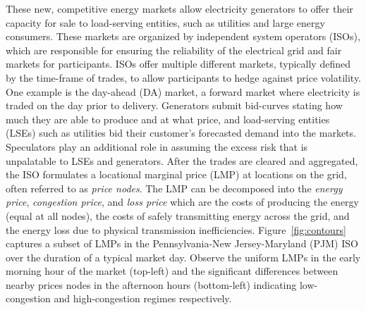 These new, competitive energy markets allow electricity generators to offer their capacity for sale to load-serving
entities, such as utilities and large energy consumers.
These markets are organized by independent system operators (ISOs), which are responsible for ensuring the reliability
of the electrical grid and fair markets for participants.
ISOs offer multiple different markets, typically defined by the time-frame of trades, to allow participants to hedge
against price volatility.
One example is the day-ahead (DA) market, a forward market where electricity is traded on the day prior to delivery.
Generators submit bid-curves stating how much they are able to produce and at what price, and load-serving
entities (LSEs) such as utilities bid their customer's forecasted demand into the markets.
Speculators play an additional role in assuming the excess risk that is unpalatable to LSEs and generators.
After the trades are cleared and aggregated, the ISO formulates a locational marginal price (LMP) at locations on the
grid, often referred to as \textit{price nodes}.
The LMP can be decomposed into the \textit{energy price}, \textit{congestion price}, and \textit{loss price} which are
the costs of producing the energy (equal at all nodes), the costs of safely transmitting energy across the grid,
and the energy loss due to physical transmission inefficiencies.
Figure~\ref{fig:contours} captures a subset of LMPs in the Pennsylvania-New Jersey-Maryland (PJM) ISO over the duration
of a typical market day.
Observe the uniform LMPs in the early morning hour of the market (top-left) and the significant differences
between nearby prices nodes in the afternoon hours (bottom-left) indicating low-congestion and high-congestion
regimes respectively.

